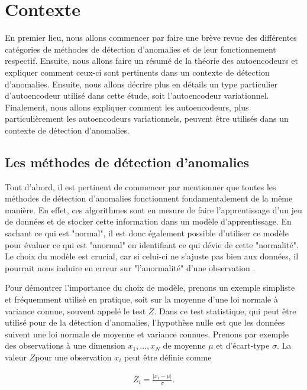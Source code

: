 \chapter{Contexte}     %
\label{chap:background}                   %

En premier lieu, nous allons commencer par faire une brève revue des différentes catégories  de méthodes de détection d'anomalies et de leur fonctionnement respectif. Ensuite, nous allons faire un résumé de la théorie des autoencodeurs et expliquer comment ceux-ci sont pertinents dans un contexte de détection d'anomalies. Ensuite, nous allons décrire plus en détails un type particulier d'autoencodeur utilisé dans cette étude, soit l'autoencodeur variationnel. Finalement, nous allons expliquer comment les autoencodeurs, plus particulièrement les autoencodeurs variationnels, peuvent être utilisés dans un contexte de détection d'anomalies.

\section{Les méthodes de détection d'anomalies}

Tout d'abord, il est pertinent de commencer par mentionner que toutes les méthodes de détection d'anomalies fonctionnent fondamentalement de la même manière. En effet, ces algorithmes sont en mesure de faire l'apprentissage d'un jeu de données et de stocker cette information dans un modèle d'apprentissage. En sachant ce qui est "normal", il est donc également possible d'utiliser ce modèle pour évaluer ce qui est "anormal" en identifiant ce qui dévie de cette "normalité". Le choix du modèle est crucial, car si celui-ci ne s'ajuste pas bien aux données, il pourrait nous induire en erreur sur "l'anormalité" d'une observation \citep{10.5555/3086742}. 

Pour démontrer l'importance du choix de modèle, prenons un exemple simpliste et fréquemment utilisé en pratique, soit sur la moyenne d'une loi normale à variance connue, souvent appelé le test $Z$. Dans ce test statistique, qui peut être utilisé pour de la détection d'anomalies, l'hypothèse nulle est que les données suivent une loi normale de moyenne et variance connues. Prenons par exemple des observations à une dimension $x_1, ..., x_N$ de moyenne $\mu$ et d'écart-type $\sigma$. La valeur $Z$\DIFaddbegin \DIFadd{; }\DIFaddend pour une observation $x_i$ peut être définie comme

\begin{gather}
Z_i = \frac{|x_i-\mu|}{\sigma}.
\end{gather}

